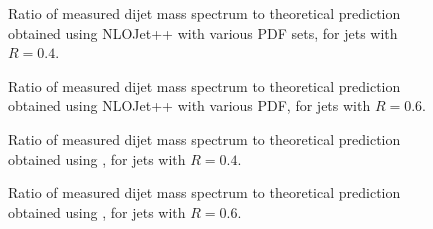 \begin{figure}[tbp]
\begin{centering}
\caption[Dijet data/theory ratio, $R$ = 0.4]{Ratio of measured dijet mass spectrum to theoretical prediction obtained using NLOJet++ with various PDF sets, for \akt jets with $R=0.4$.} 
\label{dijet_ratio_4}
\end{centering}
\end{figure}


\begin{figure}[tbp]
\begin{centering}
\caption[Dijet data/theory ratio, $R$ = 0.6]{Ratio of measured dijet mass spectrum to theoretical prediction obtained using NLOJet++ with various PDF, for \akt jets with $R=0.6$.} 
\label{dijet_ratio_6}
\end{centering}
\end{figure}



\begin{figure}[tbp]
\begin{centering}
\caption[Dijet data/theory ratio, $R$ = 0.4]{Ratio of measured dijet mass spectrum to theoretical prediction obtained using \powheg, for \akt jets with $R=0.4$.} 
\label{dijet_ratio_4p}
\end{centering}
\end{figure}


\begin{figure}[tbp]
\begin{centering}
\caption[Dijet data/theory ratio, $R$ = 0.6]{Ratio of measured dijet mass spectrum to theoretical prediction obtained using \powheg, for \akt jets with $R=0.6$.} 
\label{dijet_ratio_6p}
\end{centering}
\end{figure}

